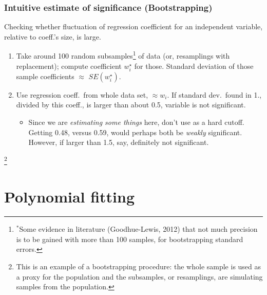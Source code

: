 \documentclass{beamer}
\theoremstyle{example}
\begin{document}
\begin{frame}
    \frametitle{Intuitive estimate of significance (Bootstrapping)}
    Checking whether fluctuation of regression coefficient for an independent variable, relative to coeff.'s size, is large.

    \begin{enumerate}
        \pause
        \item Take around 100 random subsamples\footnote{$^\ast$Some evidence in literature (Goodhue-Lewis, 2012) that not much precision is to be gained with more than 100 samples, for bootstrapping standard errors.} of data (or, resamplings with replacement); compute coefficient $w_i^\star$ for those. Standard deviation of those sample coefficients $\approx$ $SE(w_i^\star)$.
        \pause
        \item Use regression coeff.\ from whole data set, $\approx w_i$. If standard dev.\ found in {\color{strings}1.}, divided by this coeff., is larger than about 0.5, variable is not significant.
        \begin{itemize}
            \item Since we are \emph{estimating some things} here, don't use as a hard cutoff. Getting 0.48, versus 0.59, would perhaps both be \emph{weakly} significant. However, if larger than 1.5, say, definitely not significant.
        \end{itemize}
    \end{enumerate}
    
    \footnote{This is an example of a bootstrapping procedure: the whole sample is used as a proxy for the population and the subsamples, or resamplings, are simulating samples from the population.}
\end{frame}

\section{Polynomial fitting}
\end{document}
